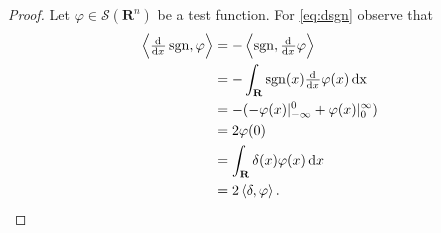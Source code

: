 \documentclass[a4paper, 11pt]{scrartcl}
\begin{document}
\begin{proof}
  Let $\varphi \in \mathcal{S}(\mathbf{R}^n)$ be a test function.
  For \eqref{eq:dsgn} observe that
  \begin{align*}
    \left<\od{}{x}\operatorname{sgn},\varphi\right> &= -\left<\operatorname{sgn},\od{}{x}\varphi\right> \\
    &=  -\int_\mathbf{R}\operatorname{sgn}(x)\od{}{x}\varphi(x)\operatorname{dx} \\
    &= -(-\varphi(x)\rvert_{-\infty}^0+\varphi(x)\rvert_{0}^\infty) \\
    &= 2\varphi(0) \\
    &= \int_\mathbf{R}\delta(x)\varphi(x)\dif x\\
    &= 2\left<\delta,\varphi\right>.\qedhere
  \end{align*}
\end{proof}
\end{document}
